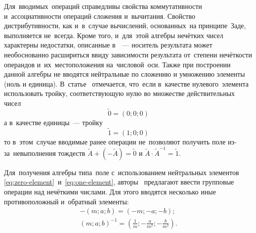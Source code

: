 Для~вводимых~операций справедливы свойства коммутативности и~ассоциативности операций сложения и~вычитания. Свойство дистрибутивности, как и~в~случае вычислений, основанных~на принципе~Заде, выполняется не~всегда. Кроме того, и~для~этой алгебры нечётких чисел характерны недостатки, описанные в~\cite{Spesivtsev, Yakhyaeva}~--– носитель результата может необоснованно расшириться ввиду зависимости результата от~степени нечёткости операндов и~их~местоположения на~числовой~оси. Также при построении данной алгебры не вводятся нейтральные по сложению и умножению элементы (ноль и единица). В~статье~\cite{Uskov_PPS} отмечается, что~если в~качестве нулевого~элемента использовать тройку, соответствующую нулю во множестве действительных чисел
\begin{equation}
\label{eq:zero-element}
	\tilde{0}=\left( 0;0;0 \right)
\end{equation}
а в~качестве единицы~--– тройку
\begin{equation}
\label{eq:one-element}
	\tilde{1}=\left( 1;0;0 \right)
\end{equation}
то в~этом~случае вводимые ранее операции не~позволяют получить поле из-за~невыполнения тождеств $\tilde{A}+\left( -\tilde{A} \right)=\tilde{0}$ и $\tilde{A}\cdot {{\tilde{A}}^{-1}}=\tilde{1}$.

Для~получения алгебры типа~поле с~использованием нейтральных элементов \eqref{eq:zero-element}~и~\eqref{eq:one-element}, авторы~\cite{Uskov_PPS} предлагают ввести групповые операции над нечёткими числами. Для этого вводятся несколько иные противоположный и~обратный элементы:
\begin{gather}
	\label{eq:reverse-minus-element}
	-\left( m;a;b \right)=\left( -m;-a;-b \right); \\ 
	\label{eq:reverse-div-element}
	\left( m;a;b \right)^{-1}=\left( \frac{1}{m};-\frac{a}{{{m}^{2}}};-\frac{b}{{{m}^{2}}} \right). 
\end{gather}

